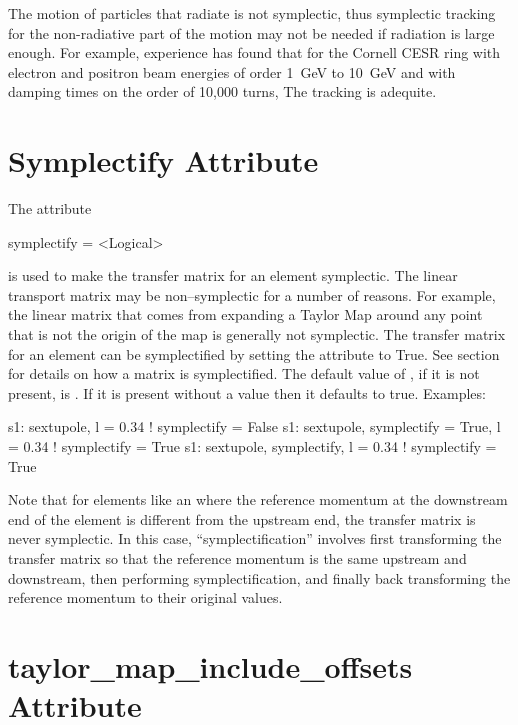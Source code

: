 The motion of particles that radiate is not symplectic, thus symplectic tracking for the
non-radiative part of the motion may not be needed if radiation is large enough. For example,
experience has found that for the Cornell CESR ring with electron and positron beam energies of
order 1~GeV to 10~GeV and with damping times on the order of 10,000 turns, The 
tracking is adequite.

\section{Symplectify Attribute}
\label{s:symp}

The  attribute
\begin{example}
  symplectify = <Logical>
\end{example}
is used to make the transfer matrix for an element symplectic. The linear transport matrix may be
non--symplectic for a number of reasons.  For example, the linear matrix that comes from expanding a
Taylor Map around any point that is not the origin of the map is generally not symplectic. The
transfer matrix for an element can be symplectified by setting the  attribute to
True. See section~ for details on how a matrix is symplectified. The default
value of , if it is not present, is . If it is present without a value
then it defaults to true. Examples:
\begin{example}
  s1: sextupole, l = 0.34                       ! symplectify = False
  s1: sextupole, symplectify = True, l = 0.34   ! symplectify = True
  s1: sextupole, symplectify, l = 0.34          ! symplectify = True
\end{example}

\label{lcavity} Note that for elements like an  where the
reference momentum at the downstream end of the element is different
from the upstream end, the transfer matrix is never symplectic. In
this case, ``symplectification'' involves first transforming the
transfer matrix so that the reference momentum is the same upstream
and downstream, then performing symplectification, and finally back
transforming the reference momentum to their original values.

\section{taylor_map_include_offsets Attribute}
\label{s:mapoff}

